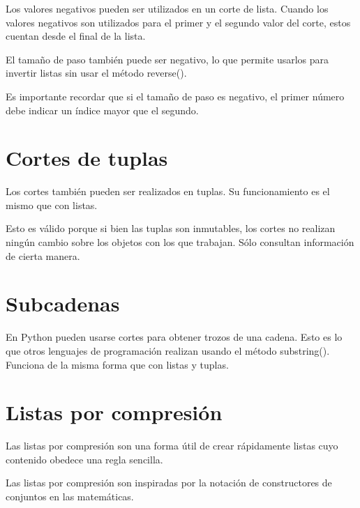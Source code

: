 \documentclass{report}
\begin{document}

Los valores negativos pueden ser utilizados en un corte de lista. Cuando los valores negativos son utilizados para el primer y el segundo valor del corte, estos cuentan desde el final de la lista.


El tamaño de paso también puede ser negativo, lo que permite usarlos para invertir listas sin usar el método reverse().


Es importante recordar que si el tamaño de paso es negativo, el primer número debe indicar un índice mayor que el segundo.

\section{Cortes de tuplas}

Los cortes también pueden ser realizados en tuplas. Su funcionamiento es el mismo que con listas.


Esto es válido porque si bien las tuplas son inmutables, los cortes no realizan ningún cambio sobre los objetos con los que trabajan. Sólo consultan información de cierta manera.

\section{Subcadenas}

En Python pueden usarse cortes para obtener trozos de una cadena. Esto es lo que otros lenguajes de programación realizan usando el método substring(). Funciona de la misma forma que con listas y tuplas.


\section{Listas por compresión}

Las listas por compresión son una forma útil de crear rápidamente listas cuyo contenido obedece una regla sencilla.


Las listas por compresión son inspiradas por la notación de constructores de conjuntos en las matemáticas.
\end{document}
